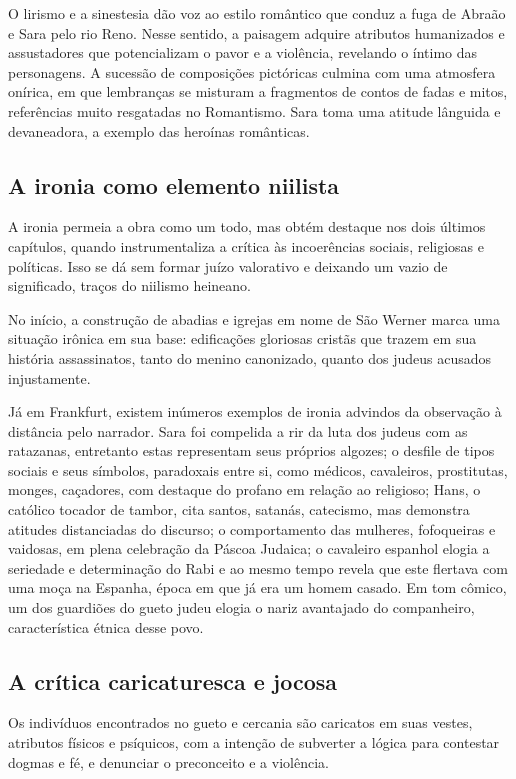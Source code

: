 \documentclass[12pt]{extarticle}
\begin{document}
O lirismo e a sinestesia dão voz ao estilo romântico que conduz a fuga
de Abraão e Sara pelo rio Reno. Nesse sentido, a paisagem adquire
atributos humanizados e assustadores que potencializam o pavor e a
violência, revelando o íntimo das personagens. A sucessão de composições
pictóricas culmina com uma atmosfera onírica, em que lembranças se
misturam a fragmentos de contos de fadas e mitos, referências muito
resgatadas no Romantismo. Sara toma uma atitude lânguida e devaneadora,
a exemplo das heroínas românticas.

\subsection{A ironia como elemento niilista}

A ironia permeia a obra como um todo, mas obtém destaque nos dois
últimos capítulos, quando instrumentaliza a crítica às incoerências
sociais, religiosas e políticas. Isso se dá sem formar juízo valorativo
e deixando um vazio de significado, traços do niilismo heineano.

No início, a construção de abadias e igrejas em nome de São Werner marca
uma situação irônica em sua base: edificações gloriosas cristãs que
trazem em sua história assassinatos, tanto do menino canonizado, quanto
dos judeus acusados injustamente.

Já em Frankfurt, existem inúmeros exemplos de ironia advindos da
observação à distância pelo narrador. Sara foi compelida a rir da luta
dos judeus com as ratazanas, entretanto estas representam seus próprios
algozes; o desfile de tipos sociais e seus símbolos, paradoxais entre
si, como médicos, cavaleiros, prostitutas, monges, caçadores, com
destaque do profano em relação ao religioso; Hans, o católico tocador de
tambor, cita santos, satanás, catecismo, mas demonstra atitudes
distanciadas do discurso; o comportamento das mulheres, fofoqueiras e
vaidosas, em plena celebração da Páscoa Judaica; o cavaleiro espanhol
elogia a seriedade e determinação do Rabi e ao mesmo tempo revela que
este flertava com uma moça na Espanha, época em que já era um homem
casado. Em tom cômico, um dos guardiões do gueto judeu elogia o nariz
avantajado do companheiro, característica étnica desse povo.

\subsection{A crítica caricaturesca e jocosa}

Os indivíduos encontrados no gueto e cercania são caricatos em suas
vestes, atributos físicos e psíquicos, com a intenção de subverter a
lógica para contestar dogmas e fé, e denunciar o preconceito e a
violência.
\end{document}
